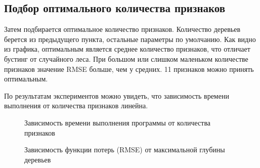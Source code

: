 \documentclass[oneside,final,12pt]{article}
\begin{document}
\subsection {Подбор оптимального количества признаков}
	Затем подбирается оптимальное количество признаков. Количество деревьев берется из предыдущего пункта, остальные параметры по умолчанию. Как видно из графика, оптимальным является среднее количество признаков, что отличает бустинг от случайного леса. При большом или слишком маленьком количестве признаков значение RMSE больше, чем у средних. 11 признаков можно принять оптимальным.

	По результатам экспериментов можно увидеть, что зависимость времени выполнения от количества признаков линейна.
\begin{figure}[h!]
\caption{Зависимость времени выполнения программы от количества признаков}
\label{fig:image6}
\end{figure}
\begin{figure}[h!]
\caption{Зависимость функции потерь (RMSE) от максимальной глубины деревьев}
\label{fig:image6}
\end{figure}
\end{document}
